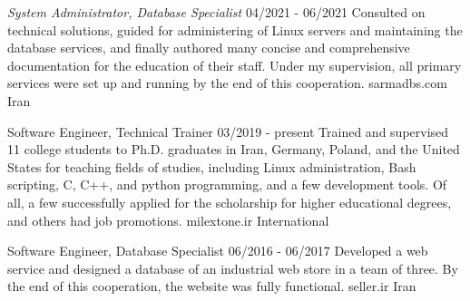 \documentclass[a4paper,12pt]{memoir} %
\begin{document}

{\textit{System Administrator, Database Specialist}}
{04/2021 - 06/2021}
{Consulted on technical solutions, guided for administering of Linux servers and maintaining the database services, and finally authored many concise and comprehensive documentation for the education of their staff.
Under my supervision, all primary services were set up and running by the end of this cooperation.}
{sarmadbs.com}
{Iran}


{Software Engineer, Technical Trainer}
{03/2019 - present}
{Trained and supervised 11 college students to Ph.D. graduates in Iran, Germany, Poland, and the United States for teaching fields of studies, including Linux administration, Bash scripting, C, C++, and python programming, and a few development tools.
Of all, a few successfully applied for the scholarship for higher educational degrees, and others had job promotions.}
{milextone.ir}
{International}


{Software Engineer, Database Specialist}
{06/2016 - 06/2017}
{Developed a web service and designed a database of an industrial web store in a team of three.
By the end of this cooperation, the website was fully functional.}
{seller.ir}
{Iran}


\Sep %


\clearpage %

\userinformation %

\framebreak %

\end{document}
